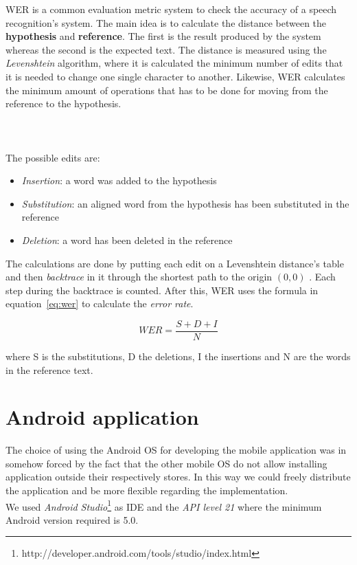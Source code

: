 \noindent WER is a common evaluation metric system to check the accuracy of a speech recognition's system. The main idea is to calculate the distance between the \textbf{hypothesis} and \textbf{reference}. The first is the result produced by the system whereas the second is the expected text. The distance is measured using the \textit{Levenshtein} algorithm, where it is calculated the minimum number of edits that it is needed to change one single character to another. Likewise, WER calculates the minimum amount of operations that has to be done for moving from the reference to the hypothesis. \\ \\ \\ \\

\noindent The possible edits are:

\begin{itemize}
	\item \textit{Insertion}: a word was added to the hypothesis
	\item \textit{Substitution}: an aligned word from the hypothesis has been substituted in the reference
	\item \textit{Deletion}: a word has been deleted in the reference
\end{itemize}

\noindent The calculations are done by putting each edit on a Levenshtein distance's table and then \textit{backtrace} in it through the shortest path to the origin $(0, 0)$ \cite{WER}. Each step during the backtrace is counted. After this, WER uses the formula in equation~\ref{eq:wer} to calculate the \textit{error rate}.

\begin{equation}
\label{eq:wer}
	WER = \frac{S + D + I}{N}
\end{equation}

\noindent where S is the substitutions, D the deletions, I the insertions and N are the words in the reference text.




\section{Android application}
\label{sec:android_app}
\noindent The choice of using the Android OS for developing the mobile application was in somehow forced by the fact that the other mobile OS do not allow installing application outside their respectively stores. In this way we could freely distribute the application and be more flexible regarding the implementation. \\
\noindent We used \textit{Android Studio}\footnote{http://developer.android.com/tools/studio/index.html} as IDE and the \textit{API level 21} where the minimum  Android version required is 5.0.

